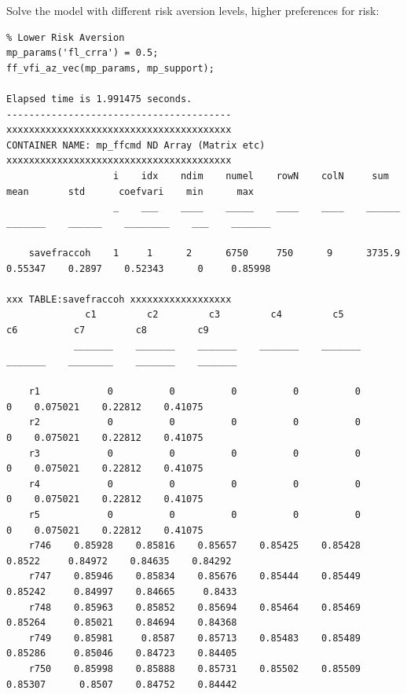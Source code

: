 \documentclass[
]{book}
\begin{document}
Solve the model with different risk aversion levels, higher preferences
for risk:

\begin{verbatim}
% Lower Risk Aversion
mp_params('fl_crra') = 0.5;
ff_vfi_az_vec(mp_params, mp_support);

Elapsed time is 1.991475 seconds.
----------------------------------------
xxxxxxxxxxxxxxxxxxxxxxxxxxxxxxxxxxxxxxxx
CONTAINER NAME: mp_ffcmd ND Array (Matrix etc)
xxxxxxxxxxxxxxxxxxxxxxxxxxxxxxxxxxxxxxxx
                   i    idx    ndim    numel    rowN    colN     sum       mean       std      coefvari    min      max  
                   _    ___    ____    _____    ____    ____    ______    _______    ______    ________    ___    _______

    savefraccoh    1     1      2      6750     750      9      3735.9    0.55347    0.2897    0.52343      0     0.85998

xxx TABLE:savefraccoh xxxxxxxxxxxxxxxxxx
              c1         c2         c3         c4         c5         c6          c7         c8         c9   
            _______    _______    _______    _______    _______    _______    ________    _______    _______

    r1            0          0          0          0          0          0    0.075021    0.22812    0.41075
    r2            0          0          0          0          0          0    0.075021    0.22812    0.41075
    r3            0          0          0          0          0          0    0.075021    0.22812    0.41075
    r4            0          0          0          0          0          0    0.075021    0.22812    0.41075
    r5            0          0          0          0          0          0    0.075021    0.22812    0.41075
    r746    0.85928    0.85816    0.85657    0.85425    0.85428     0.8522     0.84972    0.84635    0.84292
    r747    0.85946    0.85834    0.85676    0.85444    0.85449    0.85242     0.84997    0.84665     0.8433
    r748    0.85963    0.85852    0.85694    0.85464    0.85469    0.85264     0.85021    0.84694    0.84368
    r749    0.85981     0.8587    0.85713    0.85483    0.85489    0.85286     0.85046    0.84723    0.84405
    r750    0.85998    0.85888    0.85731    0.85502    0.85509    0.85307      0.8507    0.84752    0.84442
\end{verbatim}
\end{document}
